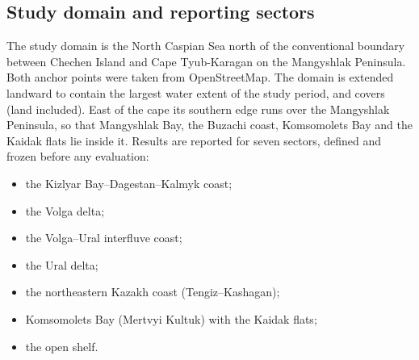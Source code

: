 
\subsection*{Study domain and reporting sectors}
The study domain is the North Caspian Sea north of the conventional boundary between Chechen Island and Cape Tyub-Karagan on the Mangyshlak Peninsula. Both anchor points were taken from OpenStreetMap. The domain is extended landward to contain the largest water extent of the study period, and covers ~\kmsq{} (land included). East of the cape its southern edge runs over the Mangyshlak Peninsula, so that Mangyshlak Bay, the Buzachi coast, Komsomolets Bay and the Kaidak flats lie inside it. Results are reported for seven sectors, defined and frozen before any evaluation:
\begin{itemize}
  \item the Kizlyar Bay--Dagestan--Kalmyk coast;
  \item the Volga delta;
  \item the Volga--Ural interfluve coast;
  \item the Ural delta;
  \item the northeastern Kazakh coast (Tengiz--Kashagan);
  \item Komsomolets Bay (Mertvyi Kultuk) with the Kaidak flats;
  \item the open shelf.
\end{itemize}
